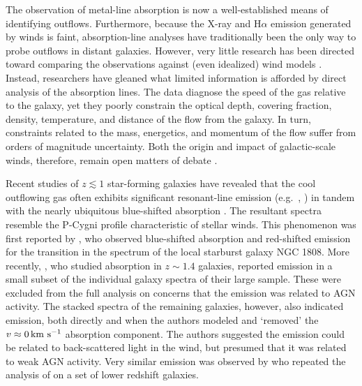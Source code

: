 \documentclass[]{emulateapj}
\begin{document}
The observation of metal-line absorption is now a well-established
means of identifying outflows.  Furthermore, because the X-ray and
H$\alpha$ emission generated by winds is faint, absorption-line
analyses have traditionally been the only way to probe outflows in
distant galaxies. However, very little research
has been directed
toward comparing the observations against (even idealized) wind
models \citep[e.g.][]{fmm+09}.  
Instead, researchers have gleaned what limited information
is afforded by direct analysis of the absorption lines.  The data
diagnose the speed of the gas relative to the galaxy, 
yet they poorly constrain the
optical depth, covering fraction, density, temperature, and distance
of the flow from the galaxy.   In turn, constraints related to the
mass, energetics, and momentum of the flow suffer from
orders of magnitude uncertainty.  Both the origin and impact of
galactic-scale winds, therefore, remain open matters of debate
\citep{mqt05,sdr08,sh09,ssr02,od06,kkd+09}.

Recent studies of $z \lesssim 1$ star-forming galaxies have revealed that
the cool outflowing gas often exhibits significant resonant-line emission (e.g.\
, ) in
tandem with the nearly ubiquitous blue-shifted absorption
\citep{wcp+09,mb09,rwk+10,cth+10}.  The resultant spectra resemble the P-Cygni
profile characteristic of stellar winds.
This phenomenon was first reported by \citet{phillips93}, who observed 
blue-shifted absorption and red-shifted emission for the \ion{Na}{1}
transition in the spectrum of the local starburst galaxy NGC 1808.
More recently, \cite{wcp+09}, who
studied  absorption in $z \sim 1.4$ galaxies, reported
\ion{Mg}{2} emission in a small subset of the individual galaxy
spectra of their large sample.  These were excluded from the full
analysis on concerns that the emission was related to AGN activity.
The stacked spectra of the remaining galaxies, however, also indicated
\ion{Mg}{2} emission, both directly and when the authors modeled and
`removed' the $v \approx 0\, {\rm km~s^{-1}}$ absorption component.  The
authors suggested the emission could be related to back-scattered
light in the wind, but presumed that it was related to weak
AGN activity.   Very similar  emission was observed by
\cite{rwk+10} who repeated the analysis of \cite{wcp+09} on a set
of lower redshift galaxies. 
\end{document}
